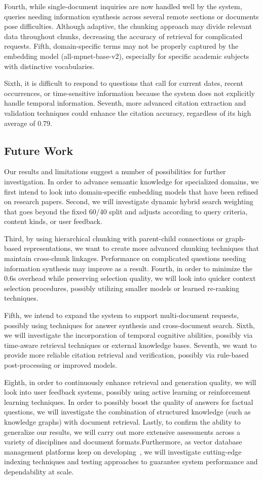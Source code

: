 \documentclass[runningheads]{llncs}
\begin{document}
Fourth, while single-document inquiries are now handled well by the system, queries needing information synthesis across several remote sections or documents pose difficulties. Although adaptive, the chunking approach may divide relevant data throughout chunks, decreasing the accuracy of retrieval for complicated requests. Fifth, domain-specific terms may not be properly captured by the embedding model (all-mpnet-base-v2), especially for specific academic subjects with distinctive vocabularies.

Sixth, it is difficult to respond to questions that call for current dates, recent occurrences, or time-sensitive information because the system does not explicitly handle temporal information. Seventh, more advanced citation extraction and validation techniques could enhance the citation accuracy, regardless of its high average of 0.79.
\subsection{Future Work}

Our results and limitations suggest a number of possibilities for further investigation. In order to advance semantic knowledge for specialized domains, we first intend to look into domain-specific embedding models that have been refined on research papers. Second, we will investigate dynamic hybrid search weighting that goes beyond the fixed 60/40 split and adjusts according to query criteria, content kinds, or user feedback.

Third, by using hierarchical chunking with parent-child connections or graph-based representations, we want to create more advanced chunking techniques that maintain cross-chunk linkages. Performance on complicated questions needing information synthesis may improve as a result. Fourth, in order to minimize the 0.6s overhead while preserving selection quality, we will look into quicker context selection procedures, possibly utilizing smaller models or learned re-ranking techniques.

Fifth, we intend to expand the system to support multi-document requests, possibly using techniques for answer synthesis and cross-document search.  Sixth, we will investigate the incorporation of temporal cognitive abilities, possibly via time-aware retrieval techniques or external knowledge bases.  Seventh, we want to provide more reliable citation retrieval and verification, possibly via rule-based post-processing or improved models.

 Eighth, in order to continuously enhance retrieval and generation quality, we will look into user feedback systems, possibly using active learning or reinforcement learning techniques.  In order to possibly boost the quality of answers for factual questions, we will investigate the combination of structured knowledge (such as knowledge graphs) with document retrieval.  Lastly, to confirm the ability to generalize our results, we will carry out more extensive assessments across a variety of disciplines and document formats.Furthermore, as vector database management platforms keep on developing~\cite{wang2025vectordb}, we will investigate cutting-edge indexing techniques and testing approaches to guarantee system performance and dependability at scale.
\end{document}
